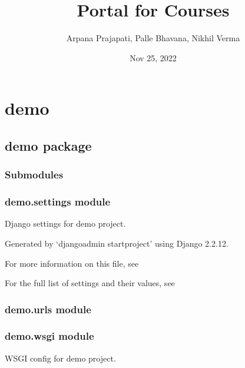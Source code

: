 \documentclass[letterpaper,10pt,english]{sphinxmanual}
\title{Portal for Courses}
\date{Nov 25, 2022}
\author{Arpana Prajapati, Palle Bhavana, Nikhil Verma}
\begin{document}
\pagestyle{empty}
\sphinxmaketitle
\pagestyle{plain}
\sphinxtableofcontents
\pagestyle{normal}
\label{\detokenize{index::doc}}



\chapter{demo}
\label{\detokenize{modules:demo}}\label{\detokenize{modules::doc}}

\section{demo package}
\label{\detokenize{demo:demo-package}}\label{\detokenize{demo::doc}}

\subsection{Submodules}
\label{\detokenize{demo:submodules}}

\subsection{demo.settings module}
\label{\detokenize{demo:module-demo.settings}}\label{\detokenize{demo:demo-settings-module}}
\sphinxAtStartPar
Django settings for demo project.

\sphinxAtStartPar
Generated by ‘django\sphinxhyphen{}admin startproject’ using Django 2.2.12.

\sphinxAtStartPar
For more information on this file, see

\sphinxAtStartPar
For the full list of settings and their values, see


\subsection{demo.urls module}
\label{\detokenize{demo:demo-urls-module}}

\subsection{demo.wsgi module}
\label{\detokenize{demo:module-demo.wsgi}}\label{\detokenize{demo:demo-wsgi-module}}
\sphinxAtStartPar
WSGI config for demo project.
\end{document}
